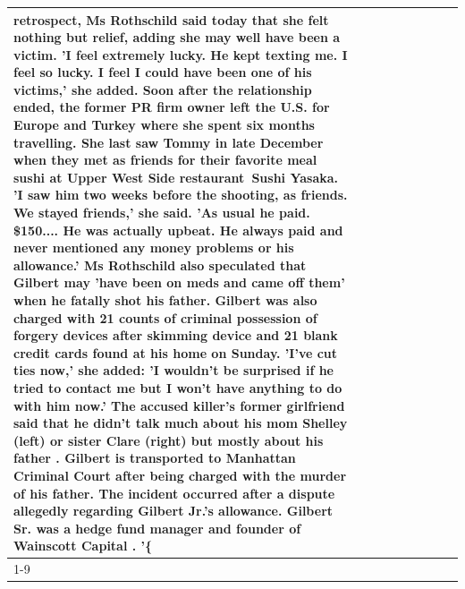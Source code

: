 \begin{table}[H]
\begin{tabular}{lllrlllll}
retrospect, Ms Rothschild said today that she felt nothing but relief, adding she may well have been a victim. 'I feel extremely lucky. He kept texting me. I feel so lucky. I feel I could have been one of his victims,' she added. Soon after the relationship ended, the former PR firm owner left the U.S. for Europe and Turkey where she spent six months  travelling. She last saw Tommy in late December when they met as friends for their favorite meal sushi at Upper West Side restaurant Sushi Yasaka. 'I saw him two weeks before the shooting, as friends. We stayed friends,' she said. 'As usual he paid. \$150.... He was actually upbeat. He always paid and never mentioned any money problems or his allowance.' Ms Rothschild also speculated that Gilbert may 'have been on meds and came off them' when he fatally shot his father. Gilbert was also charged with 21 counts of criminal possession of forgery devices after skimming device and 21 blank credit cards found at his home on Sunday. 'I've cut ties now,' she added: 'I wouldn’t be surprised if he tried to contact me but I won’t have anything to do with him now.' The accused killer's former girlfriend said that he didn't talk much about his mom Shelley (left) or sister Clare (right) but mostly about his father . Gilbert is transported to Manhattan Criminal Court  after being charged with the murder of his father. The incident occurred after a dispute allegedly regarding Gilbert Jr.'s allowance. Gilbert Sr. was a hedge fund manager and founder of Wainscott Capital . '\{ \\
\cline{1-9}

\end{tabular}
\end{table}
